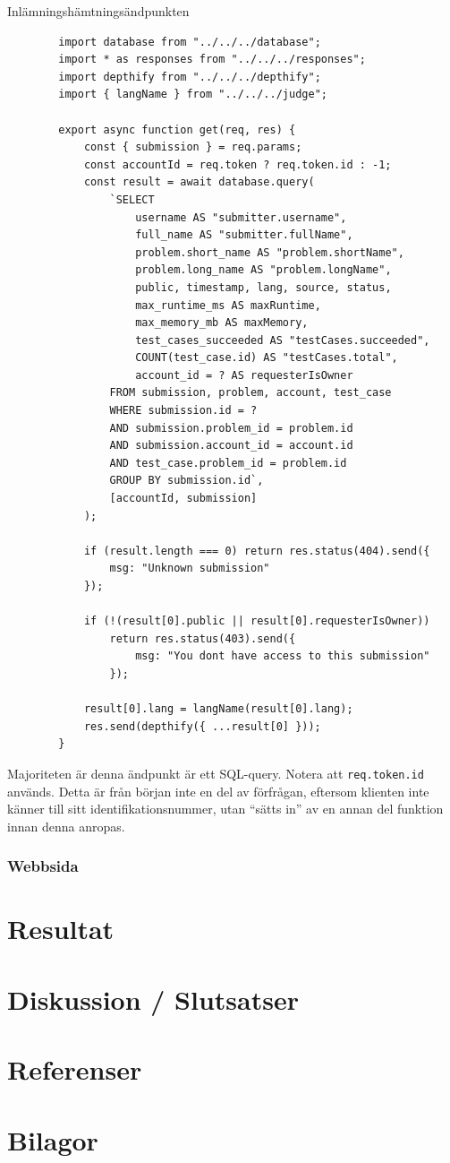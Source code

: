 \documentclass{article}
\begin{document}
\begin{listing}[H]
	\caption{Inlämningshämtningsändpunkten}
	\begin{verbatim}
		import database from "../../../database";
		import * as responses from "../../../responses";
		import depthify from "../../../depthify";
		import { langName } from "../../../judge";

		export async function get(req, res) {
			const { submission } = req.params;
			const accountId = req.token ? req.token.id : -1;
			const result = await database.query(
				`SELECT
					username AS "submitter.username",
					full_name AS "submitter.fullName",
					problem.short_name AS "problem.shortName",
					problem.long_name AS "problem.longName",
					public, timestamp, lang, source, status,
					max_runtime_ms AS maxRuntime,
					max_memory_mb AS maxMemory,
					test_cases_succeeded AS "testCases.succeeded",
					COUNT(test_case.id) AS "testCases.total",
					account_id = ? AS requesterIsOwner
				FROM submission, problem, account, test_case
				WHERE submission.id = ?
				AND submission.problem_id = problem.id
				AND submission.account_id = account.id
				AND test_case.problem_id = problem.id
				GROUP BY submission.id`,
				[accountId, submission]
			);

			if (result.length === 0) return res.status(404).send({
				msg: "Unknown submission"
			});

			if (!(result[0].public || result[0].requesterIsOwner))
				return res.status(403).send({
					msg: "You dont have access to this submission"
				});

			result[0].lang = langName(result[0].lang);
			res.send(depthify({ ...result[0] }));
		}
	\end{verbatim}
\end{listing}

Majoriteten är denna ändpunkt är ett SQL-query. Notera att
\texttt{req.token.id} används. Detta är från början inte en del av förfrågan,
eftersom klienten inte känner till sitt identifikationsnummer, utan ``sätts in''
av en annan del funktion innan denna anropas.

\subsubsection{Webbsida}


\section{Resultat}

\section{Diskussion / Slutsatser}

\section{Referenser}

\section{Bilagor}

\listoffigures{}
\end{document}
